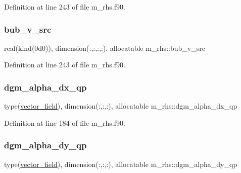 Definition at line 243 of file m\+\_\+rhs.\+f90.

\mbox{\label{namespacem__rhs_a35e063bb3f8fd0f8210a6305d01cae96}} 
\subsubsection{\texorpdfstring{bub\+\_\+v\+\_\+src}{bub\_v\_src}}
{\footnotesize\ttfamily real(kind(0d0)), dimension(\+:,\+:,\+:,\+:), allocatable m\+\_\+rhs\+::bub\+\_\+v\+\_\+src}



Definition at line 243 of file m\+\_\+rhs.\+f90.

\mbox{\label{namespacem__rhs_a1ecb03602517ea0c6a8594ac84d7baf6}} 
\subsubsection{\texorpdfstring{dgm\+\_\+alpha\+\_\+dx\+\_\+qp}{dgm\_alpha\_dx\_qp}}
{\footnotesize\ttfamily type(\hyperlink{structm__derived__types_1_1vector__field}{vector\+\_\+field}), dimension(\+:,\+:,\+:), allocatable m\+\_\+rhs\+::dgm\+\_\+alpha\+\_\+dx\+\_\+qp}



Definition at line 184 of file m\+\_\+rhs.\+f90.

\mbox{\label{namespacem__rhs_ada84d050bc469e99491f0df609abae94}} 
\subsubsection{\texorpdfstring{dgm\+\_\+alpha\+\_\+dy\+\_\+qp}{dgm\_alpha\_dy\_qp}}
{\footnotesize\ttfamily type(\hyperlink{structm__derived__types_1_1vector__field}{vector\+\_\+field}), dimension(\+:,\+:,\+:), allocatable m\+\_\+rhs\+::dgm\+\_\+alpha\+\_\+dy\+\_\+qp}



